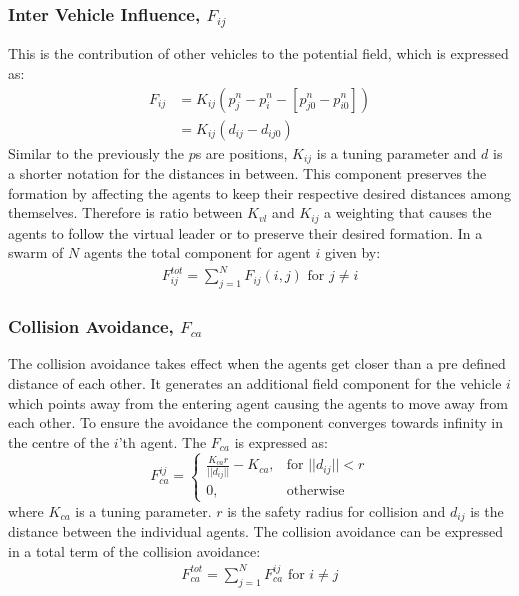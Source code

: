 \subsubsection{Inter Vehicle Influence, $F_{ij}$}
This is the contribution of other vehicles to the potential field, which is expressed as:
\begin{align}
F_{ij} &= K_{ij}(p_{j}^n-p_i^n-[p_{j0}^n-p_{i0}^n])\\
&= K_{ij}(d_{ij}-d_{ij0})
\end{align}
Similar to the previously the $p$s are positions, $K_{ij}$ is a tuning parameter and $d$ is a shorter notation for the distances in between. This component preserves the formation by affecting the agents to keep their respective desired distances among themselves. Therefore is ratio between $K_{vl}$ and $K_{ij}$ a weighting that causes the agents to follow the virtual leader or to preserve their desired formation. In a swarm of $N$ agents the total component for agent $i$ given by:
\begin{align}
F_{ij}^{tot} = \sum\limits_{j=1}^NF_{ij}(i,j) \text{ for } j\neq i
\end{align}

\subsubsection{Collision Avoidance, $F_{ca}$}
The collision avoidance takes effect when the agents get closer than a pre defined distance of each other. It generates an additional field component for the vehicle $i$ which points away from the entering agent causing the agents to move away from each other. To ensure the avoidance the component converges towards infinity in the centre of the $i$'th agent. The $F_{ca}$ is expressed as:
\[
    F_{ca}^{ij}= 
\begin{cases}
    \frac{K_{ca}r}{||d_{ij}||}-K_{ca},& \text{for } ||d_{ij}||<r\\
    0,              & \text{otherwise}
\end{cases}
\]
where $K_{ca}$ is a tuning parameter. $r$ is the safety radius for collision and $d_{ij}$ is the distance between the individual agents.
The collision avoidance can be expressed in a total term of the collision avoidance:
\begin{align}
F_{ca}^{tot} = \sum\limits_{j=1}^NF_{ca}^{ij} \text{ for } i\neq j
\end{align}


